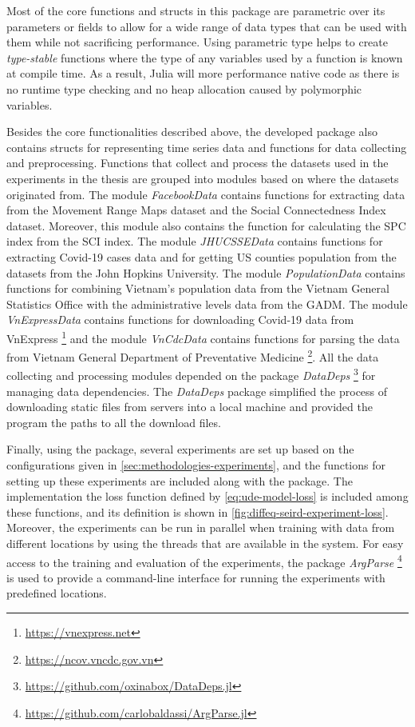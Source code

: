 Most of the core functions and structs in this package are parametric over its parameters or fields to allow for a wide range of data types that can be used with them while not sacrificing performance.
Using parametric type helps to create \textit{type-stable} functions where the type of any variables used by a function is known at compile time.
As a result, Julia will more performance native code as there is no runtime type checking and no heap allocation caused by polymorphic variables.

Besides the core functionalities described above, the developed package also contains structs for representing time series data and functions for data collecting and preprocessing.
Functions that collect and process the datasets used in the experiments in the thesis are grouped into modules based on where the datasets originated from.
The module \textit{FacebookData} contains functions for extracting data from the Movement Range Maps dataset and the Social Connectedness Index dataset.
Moreover, this module also contains the function for calculating the \gls{SPC} index from the \gls{SCI} index.
The module \textit{JHUCSSEData} contains functions for extracting Covid-19 cases data and for getting \gls{US} counties population from the datasets from the John Hopkins University.
The module \textit{PopulationData} contains functions for combining Vietnam's population data from the Vietnam General Statistics Office with the administrative levels data from the \gls{GADM}.
The module \textit{VnExpressData} contains functions for downloading Covid-19 data from VnExpress \footnote{\url{https://vnexpress.net}} and the module \textit{VnCdcData} contains functions for parsing the data from Vietnam General Department of Preventative Medicine \footnote{\url{https://ncov.vncdc.gov.vn}}.
All the data collecting and processing modules depended on the package \textit{DataDeps} \footnote{\url{https://github.com/oxinabox/DataDeps.jl}} for managing data dependencies.
The \textit{DataDeps} package simplified the process of downloading static files from servers into a local machine and provided the program the paths to all the download files.

Finally, using the package, several experiments are set up based on the configurations given in \autoref{sec:methodologies-experiments}, and the functions for setting up these experiments are included along with the package.
The implementation the loss function defined by \autoref{eq:ude-model-loss} is included among these functions, and its definition is shown in \autoref{fig:diffeq-seird-experiment-loss}.
Moreover, the experiments can be run in parallel when training with data from different locations by using the threads that are available in the system.
For easy access to the training and evaluation of the experiments, the package \textit{ArgParse} \footnote{\url{https://github.com/carlobaldassi/ArgParse.jl}} is used to provide a command-line interface for running the experiments with predefined locations.

